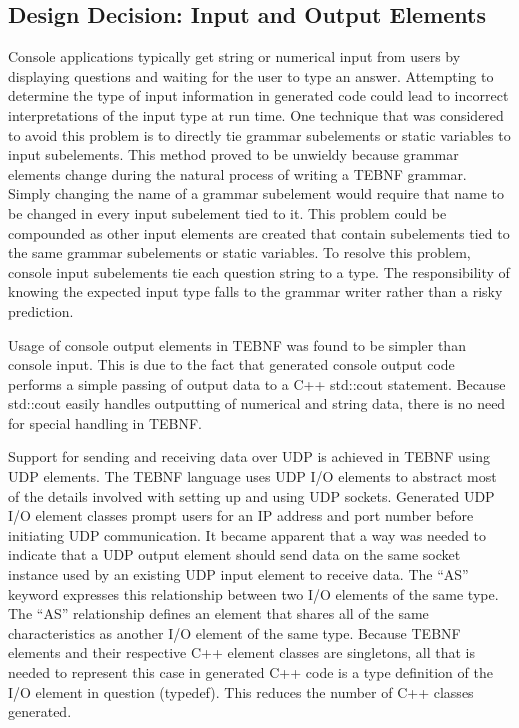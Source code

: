 \subsection{Design Decision: Input and Output Elements} \label{ssec:IoElements}
Console applications typically get string or numerical input from users by displaying questions and waiting for the user to type an answer.  Attempting to determine the type of input information in generated code could lead to incorrect interpretations of the input type at run time.  One technique that was considered to avoid this problem is to directly tie grammar subelements or static variables to input subelements.  This method proved to be unwieldy because grammar elements change during the natural process of writing a TEBNF grammar.  Simply changing the name of a grammar subelement would require that name to be changed in every input subelement tied to it.  This problem could be compounded as other input elements are created that contain subelements tied to the same grammar subelements or static variables.   To resolve this problem, console input subelements tie each question string to a type.  The responsibility of knowing the expected input type falls to the grammar writer rather than a risky prediction.

\indent
Usage of console output elements in TEBNF was found to be simpler than console input.  This is due to the fact that generated console output code performs a simple passing of output data to a C++ std::cout statement.   Because std::cout easily handles outputting of numerical and string data, there is no need for special handling in TEBNF.

\indent
Support for sending and receiving data over UDP is achieved in TEBNF using UDP elements.  The TEBNF language uses UDP I/O elements to abstract most of the details involved with setting up and using UDP sockets.  Generated UDP I/O element classes prompt users for an IP address and port number before initiating UDP communication.  It became apparent that a way was needed to indicate that a UDP output element should send data on the same socket instance used by an existing UDP input element to receive data.  The “AS” keyword expresses this relationship between two I/O elements of the same type.  The “AS” relationship defines an element that shares all of the same characteristics as another I/O element of the same type.  Because TEBNF elements and their respective C++ element classes are singletons, all that is needed to represent this case in generated C++ code is a type definition of the I/O element in question (typedef).  This reduces the number of C++ classes generated.

